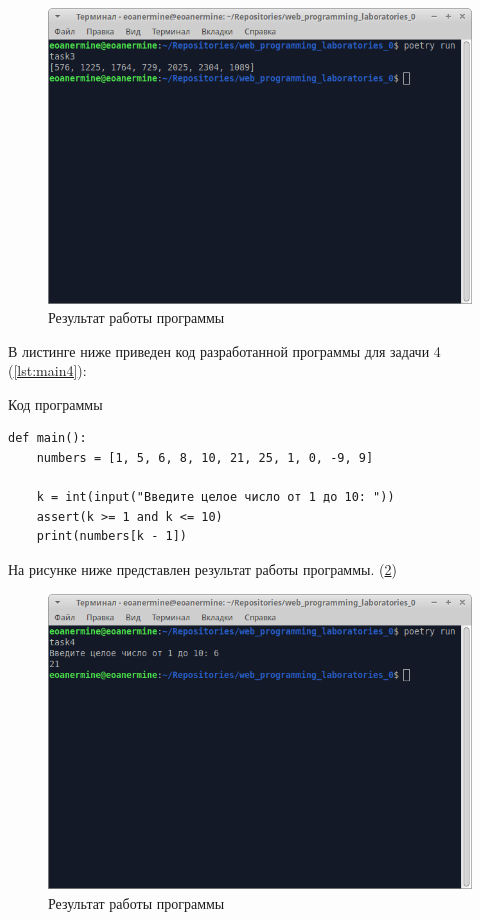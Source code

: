 \documentclass[14pt]{extarticle}
\newenvironment{code}{\captionsetup{type=listing, belowskip=-14pt plus 3pt minus 0pt}}{}
\begin{document}
\begin{figure}[H]
    \centering
    \includegraphics[width=1.0\linewidth]{main3.png}
    \caption{Результат работы программы\label{img:main3}}
\end{figure}

В листинге ниже приведен код разработанной программы для задачи 4 (\ref{lst:main4}):

\begin{code}    
\caption{Код программы\label{lst:main4}}
\begin{verbatim}
def main():
	numbers = [1, 5, 6, 8, 10, 21, 25, 1, 0, -9, 9]

	k = int(input("Введите целое число от 1 до 10: "))
	assert(k >= 1 and k <= 10)
	print(numbers[k - 1])
\end{verbatim}
\end{code}

На рисунке ниже представлен результат работы программы. (\ref{img:main4})

\begin{figure}[H]
    \centering
    \includegraphics[width=1.0\linewidth]{main4.png}
    \caption{Результат работы программы\label{img:main4}}
\end{figure}
\end{document}
